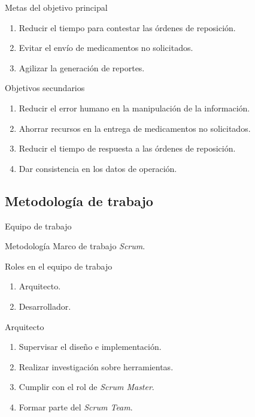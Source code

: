 	\begin{frame}{Metas del objetivo principal}
		\begin{enumerate}
			\item Reducir el tiempo para contestar las órdenes de reposición.
			\item Evitar el envío de medicamentos no solicitados.
			\item Agilizar la generación de reportes.
		\end{enumerate}
	\end{frame}

	\begin{frame}{Objetivos secundarios}
		\begin{enumerate}
		\item Reducir el error humano en la manipulación de la información.
		\item Ahorrar recursos en la entrega de medicamentos no solicitados.
		\item Reducir el tiempo de respuesta a las órdenes de reposición.
		\item Dar consistencia en los datos de operación.
		\end{enumerate}
	\end{frame}

\subsection{Metodología de trabajo}
	\begin{frame}{Equipo de trabajo}
		\begin{block}{Metodología}
			Marco de trabajo \textit{Scrum}.
		\end{block}
		\begin{block}{Roles en el equipo de trabajo}
			\begin{enumerate}
				\item Arquitecto.
				\item Desarrollador.
			\end{enumerate}
		\end{block}
	\end{frame}

	\begin{frame}{Arquitecto}
		\begin{enumerate}
			\item Supervisar el diseño e implementación.
			\item Realizar investigación sobre herramientas.
			\item Cumplir con el rol de \textit{Scrum Master}.
			\item Formar parte del \textit{Scrum Team}.
		\end{enumerate}
	\end{frame}

